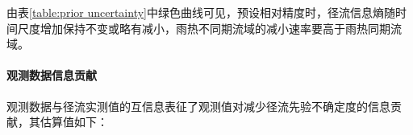 由表\ref{table:prior uncertainty}中绿色曲线可见，预设相对精度时，径流信息熵随时间尺度增加保持不变或略有减小，雨热不同期流域的减小速率要高于雨热同期流域。
\iffalse
For relative constant resolution, most of the estimations reach their maximum points at temporal scales varying from    
1 to 2 months, except for 5 out of 7 catchments from the asynchronous rainfall energy climate group, which take on a monotonically decreasing trend across the estimated temporal scales. The decreasing rates of entropy with temporal scales in catchments from synchronous climate groups are not as significant as those from asynchronous groups. 
\fi
\paragraph{观测数据信息贡献}
观测数据与径流实测值的互信息表征了观测值对减少径流先验不确定度的信息贡献，其估算值如下：

